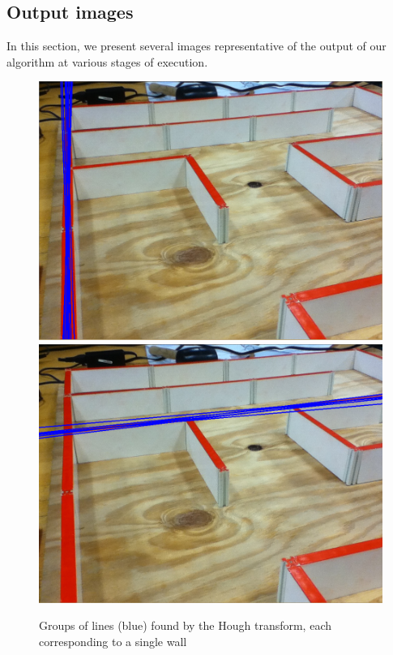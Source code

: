 \documentclass[10pt,twocolumn,letterpaper]{article}
\begin{document}
\subsection{Output images}
\label{sub:output_images}

In this section, we present several images representative of the output of our algorithm at various stages of execution.
\vfill
\clearpage

\begin{figure}[h!]
\begin{center}
	\includegraphics[width=0.8\linewidth]{images/houghlines1.png}
	\includegraphics[width=0.8\linewidth]{images/houghlines2.png}
\end{center}
\caption{Groups of lines (blue) found by the Hough transform, each corresponding to a single wall}
\label{fig:houghgroups}
\end{figure}
\end{document}
